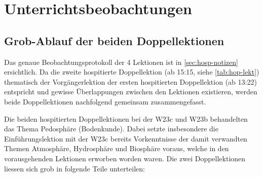 \section{Unterrichtsbeobachtungen}
\subsection{Grob-Ablauf der beiden Doppellektionen}

Das genaue Beobachtungsprotokoll der 4 Lektionen ist in \cref{sec:hosp-notizen} ersichtlich. Da die zweite hospitierte Doppellektion (ab 15:15, siehe \cref{tab:hop-lekt}) thematisch der Vorgängerlektion der ersten hospitierten Doppellektion (ab 13:22) entspricht und gewisse Überlappungen zwischen den Lektionen existieren, werden beide Doppellektionen nachfolgend gemeinsam zusammengefasst.

Die beiden hospitierten Doppellektionen bei der W23c und W23b behandelten das Thema Pedosphäre (Bodenkunde). Dabei setzte insbesondere die Einführungslektion mit der W23c bereits Vorkenntnisse der damit verwandten Themen Atmosphäre, Hydrosphäre und Biosphäre voraus, welche in den vorausgehenden Lektionen erworben worden waren. Die zwei Doppellektionen liessen sich grob in folgende Teile unterteilen:

